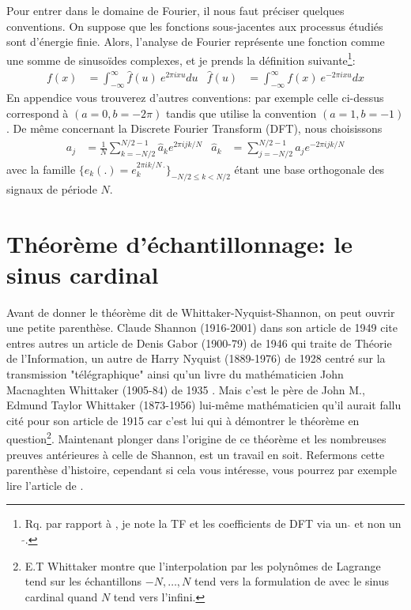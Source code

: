 \documentclass[11pt,twoside]{article}
\begin{document}
Pour entrer dans le domaine de Fourier, il nous faut préciser quelques conventions. On suppose que les fonctions sous-jacentes aux processus étudiés sont d'énergie finie. Alors, l'analyse de Fourier représente une fonction comme une somme de sinusoïdes complexes, et je prends la définition suivante\footnote{Rq. par rapport à \citep{2014PASP..126..287B}, je note la TF et les coefficients de DFT via un $\hat{}$ et non un $\tilde{}$.}: 
\begin{align}
f(x) &= \int_{-\infty}^\infty \hat{f}(u)\ e^{2\pi i xu} du &
\hat{f}(u) &= \int_{-\infty}^\infty f(x)\ e^{-2\pi i xu} dx 
\label{eq:TF}
\end{align}
En appendice vous trouverez d'autres conventions: par exemple celle ci-dessus correspond à $(a=0, b=-2\pi)$ tandis que \cite{10.5555/1525499} utilise la convention $(a=1, b=-1)$. De même concernant la Discrete Fourier Transform (DFT), nous choisissons
\begin{align}
a_j &= \frac{1}{N}\sum_{k=-N/2}^{N/2-1} \hat{a}_k e^{2\pi i jk/N} &
\hat{a}_k &= \sum_{j=-N/2}^{N/2-1} a_j e^{-2\pi i jk/N}
\label{eq:DFT}
\end{align}
avec la famille $\{e_k(.)=e^{2\pi i k/N\, .}_k \}_{-N/2 \leq k<N/2}$ étant une base orthogonale des signaux de période $N$.
%
\section{Théorème d'échantillonnage: le sinus cardinal}
%
Avant de donner le théorème dit de Whittaker-Nyquist-Shannon, on peut ouvrir une petite parenthèse. Claude Shannon (1916-2001) dans son article de 1949 \citep{1697831} cite entres autres un article de Denis Gabor (1900-79) de 1946 \citep{gabor1946} qui traite de Théorie de l'Information, un autre  de Harry Nyquist (1889-1976) de 1928 \citep{Nyquist1928CertainTI} centré sur la transmission "télégraphique" ainsi qu'un livre du mathématicien John Macnaghten  Whittaker (1905-84) de 1935 \citep{whittaker1949interpolatory}. Mais c'est le père de John M., Edmund Taylor Whittaker (1873-1956) lui-même mathématicien qu'il aurait fallu cité pour son article de 1915 \citep{whittaker_1915} car c'est lui qui à démontrer le théorème en question\footnote{E.T Whittaker montre que l'interpolation par les polynômes de Lagrange tend sur les échantillons $-N,\dots,N$ tend vers la formulation de avec le sinus cardinal quand $N$ tend vers l'infini.}. Maintenant plonger dans l'origine de ce théorème et les nombreuses preuves antérieures à celle de Shannon, est un travail en soit. Refermons cette parenthèse d'histoire, cependant si cela vous intéresse, vous pourrez par exemple lire l'article de \cite{Dodson2002}.
\end{document}

